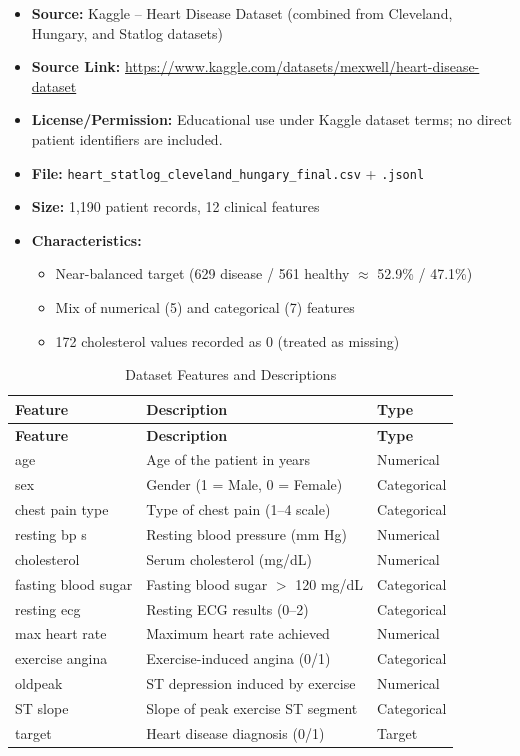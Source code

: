 \documentclass[12pt,a4paper]{article}
\begin{document}
\begin{itemize}
    \item \textbf{Source:} Kaggle -- Heart Disease Dataset (combined from Cleveland, Hungary, and Statlog datasets)
    \item \textbf{Source Link:} \url{https://www.kaggle.com/datasets/mexwell/heart-disease-dataset}
    \item \textbf{License/Permission:} Educational use under Kaggle dataset terms; no direct patient identifiers are included.
    \item \textbf{File:} \texttt{heart\_statlog\_cleveland\_hungary\_final.csv} + \texttt{.jsonl}
    \item \textbf{Size:} 1,190 patient records, 12 clinical features
    \item \textbf{Characteristics:}
    \begin{itemize}
        \item Near-balanced target (629 disease / 561 healthy $\approx$ 52.9\% / 47.1\%)
        \item Mix of numerical (5) and categorical (7) features
        \item 172 cholesterol values recorded as 0 (treated as missing)
    \end{itemize}
\end{itemize}

\begin{longtable}{|l|l|l|}
\caption{Dataset Features and Descriptions} \\
\hline
\textbf{Feature} & \textbf{Description} & \textbf{Type} \\
\hline
\endfirsthead
\hline
\textbf{Feature} & \textbf{Description} & \textbf{Type} \\
\hline
\endhead
age & Age of the patient in years & Numerical \\
sex & Gender (1 = Male, 0 = Female) & Categorical \\
chest pain type & Type of chest pain (1--4 scale) & Categorical \\
resting bp s & Resting blood pressure (mm Hg) & Numerical \\
cholesterol & Serum cholesterol (mg/dL) & Numerical \\
fasting blood sugar & Fasting blood sugar $>$ 120 mg/dL & Categorical \\
resting ecg & Resting ECG results (0--2) & Categorical \\
max heart rate & Maximum heart rate achieved & Numerical \\
exercise angina & Exercise-induced angina (0/1) & Categorical \\
oldpeak & ST depression induced by exercise & Numerical \\
ST slope & Slope of peak exercise ST segment & Categorical \\
target & Heart disease diagnosis (0/1) & Target \\
\hline
\end{longtable}
\end{document}
